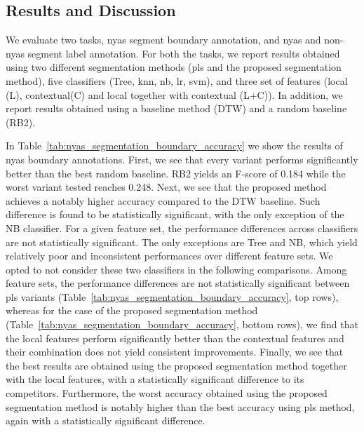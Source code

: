 {%
%

\subsection{Results and Discussion}
\label{sec:preprocessing_nyas_segmentation_results_and_discussion}

We evaluate two tasks, \gls{nyas} segment boundary annotation, and \gls{nyas} and non-\gls{nyas} segment label annotation. For both the tasks, we report results obtained using two different segmentation methods (\gls{pls} and the proposed segmentation method), five classifiers (Tree, \gls{knn}, \gls{nb}, \gls{lr}, \gls{svm}), and three set of features (local (L), contextual(C) and local together with contextual (L+C)). In addition, we report results obtained using a baseline method (DTW) and a random baseline (RB2).

In Table~\ref{tab:nyas_segmentation_boundary_accuracy} we show the results of \gls{nyas} boundary annotations. First, we see that every variant performs significantly better than the best random baseline. RB2 yields an F-score of 0.184 while the worst variant tested reaches 0.248. Next, we see that the proposed method achieves a notably higher accuracy compared to the DTW baseline. Such difference is found to be statistically significant, with the only exception of the NB classifier. For a given feature set, the performance differences across classifiers are not statistically significant. The only exceptions are Tree and NB, which yield relatively poor and inconsistent performances over different feature sets. We opted to not consider these two classifiers in the following comparisons. Among  feature sets, the performance differences are not statistically significant between \gls{pls} variants (Table~\ref{tab:nyas_segmentation_boundary_accuracy}, top rows), whereas for the case of the proposed segmentation method (Table~\ref{tab:nyas_segmentation_boundary_accuracy}, bottom rows), we find that the local features perform significantly better than the contextual features and their combination does not yield consistent improvements. Finally, we see that the best results are obtained using the proposed segmentation method together with the local features, with a statistically significant difference to its competitors. Furthermore, the worst accuracy obtained using the proposed segmentation method is notably higher than the best accuracy using \gls{pls} method, again with a statistically significant difference.

}
